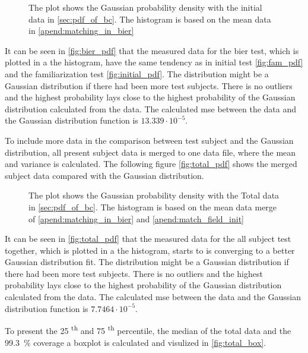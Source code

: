  \begin{figure}[H]
	\centering
	
		\caption{The plot shows the Gaussian probability density with the initial data in \autoref{sec:pdf_of_bc}. The histogram is based on the mean data in \autoref{apend:matching_in_bier}}
		\label{fig:bier_pdf}
\end{figure}

It can be seen in \autoref{fig:bier_pdf} that the measured data for the \gls{bier} test, which is plotted in a the histogram, have the same tendency as in initial test \autoref{fig:fam_pdf} and the familiarization test \autoref{fig:initial_pdf}. The distribution might be a Gaussian distribution if there had been more test subjects. There is no outliers and the highest probability lays close to the highest probability of the Gaussian distribution calculated from the data. The calculated \gls{mse} between the data and the Gaussian distribution function is $13.339 \cdot 10^{-5}$.



To include more data in the comparison between test subject and the Gaussian distribution, all present subject data is merged to one data file, where the mean and variance is calculated. The following figure \autoref{fig:total_pdf} shows the merged subject data compared with the Gaussian distribution.

 \begin{figure}[H]
	\centering
	
		\caption{The plot shows the Gaussian probability density with the Total data in \autoref{sec:pdf_of_bc}. The histogram is based on the mean data merge of \autoref{apend:matching_in_bier} and \autoref{apend:match_field_init}}
		\label{fig:total_pdf}
\end{figure}

It can be seen in \autoref{fig:total_pdf} that the measured data for the all subject test together, which is plotted in a the histogram, starts to is converging to a better Gaussian distribution fit. The distribution might be a Gaussian distribution if there had been more test subjects. There is no outliers and the highest probability lays close to the highest probability of the Gaussian distribution calculated from the data. The calculated \gls{mse} between the data and the Gaussian distribution function is $7.7464 \cdot 10^{-5}$.

To present the 25 \textsuperscript{th} and 75 \textsuperscript{th} percentile, the median of the total data and the \SI{99.3}{\percent} coverage a boxplot is calculated and visulized in \autoref{fig:total_box}.

